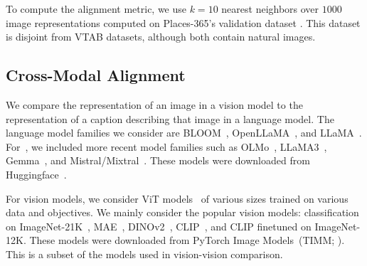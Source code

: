 
To compute the alignment metric, we use $k=10$ nearest neighbors over $1000$ image representations computed on Places-365's validation dataset \citep{zhou2017places}. This dataset is disjoint from VTAB datasets, although both contain natural images.

\subsection{Cross-Modal Alignment}
\label{sec:vision-language-details}

We compare the representation of an image in a vision model to the representation of a caption describing that image in a language model. The language model families we consider are BLOOM~\cite{bigscience2022bloom}, OpenLLaMA~\cite{openlm2023openllama}, and LLaMA~\cite{touvron2023llama}.
For~, we included more recent model families such as OLMo~\cite{groeneveld2024olmo}, LLaMA3~\cite{meta2024llama3}, Gemma~\cite{team2024gemma}, and Mistral/Mixtral~\cite{jiang2023mistral,jiang2024mixtral}. These models were downloaded from Huggingface~\cite{wolf2019huggingface}.

For vision models, we consider ViT models~\cite{dosovitskiy2020image} of various sizes trained on various data and objectives. We mainly consider the popular vision models: classification on ImageNet-21K~\cite{russakovsky2015imagenet}, MAE~\cite{he2021masked}, DINOv2~\cite{oquab2023dinov2}, CLIP~\cite{radford2021learning}, and CLIP finetuned on ImageNet-12K. These models were downloaded from PyTorch Image Models~(TIMM; \citet{timm}). This is a subset of the models used in vision-vision comparison.




